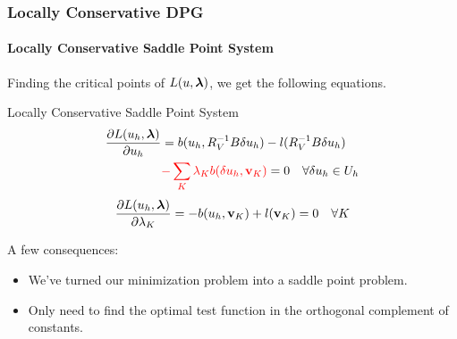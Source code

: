 \documentclass[18pt,xcolor=table]{beamer}
\begin{document}
\begin{frame}
\frametitle{Locally Conservative DPG}
\framesubtitle{Locally Conservative Saddle Point System}
Finding the critical points of $L(u,\boldsymbol\lambda)$, we get the following
equations.
\begin{block}{Locally Conservative Saddle Point System}
\begin{align*}
\frac{\partial L(u_h,\boldsymbol\lambda)}{\partial u_h}&=b(u_h,R_V^{-1}B\delta u_h)
-l(R_V^{-1}B\delta u_h)\\
&{\color{red}-\sum_K\lambda_K b(\delta
u_h,\mathbf{v}_K)}=0\quad\forall\delta u_h\in U_h
\end{align*}
\[
\frac{\partial
L(u_h,\boldsymbol\lambda)}{\partial\lambda_K}=-b(u_h,\mathbf{v}_K)+l(\mathbf{v}_K)=0\quad\forall
K
\]
\end{block}
A few consequences:
\begin{itemize}
\item We've turned our minimization problem into a saddle point problem.
\item Only need to find the optimal test function in the orthogonal complement
of constants. %
\end{itemize}
\end{frame}

\end{document}
